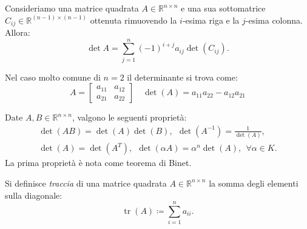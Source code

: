 \begin{theorem}
	Consideriamo una matrice quadrata $A\in \mathbb{R}^{n\times n}$ e una sua sottomatrice $C_{ij} \in \mathbb{R}^{( n-1) \times ( n-1)}$ ottenuta rimuovendo la $i$-esima riga e la $j$-esima colonna.
  Allora:
	\begin{equation*}
		\operatorname{det} A=\sum ^{n}_{j=1}( -1)^{i+j} a_{ij}\operatorname{det}( C_{ij}) .
	\end{equation*}
\end{theorem}
Nel caso molto comune di $n=2$ il determinante si trova come:
\begin{equation*}
A=\begin{bmatrix}
a_{11} & a_{12}\\
a_{21} & a_{22}
\end{bmatrix} \quad \operatorname{det}( A) =a_{11} a_{22} -a_{12} a_{21}
\end{equation*}
\begin{theorem}
	Date $A,B\in \mathbb{R}^{n\times n}$, valgono le seguenti proprietà:
	\begin{gather*}
		\operatorname{det}( AB) =\operatorname{det}( A)\operatorname{det}( B) ,\ \ \operatorname{det}\left( A^{-1}\right) =\frac{1}{\operatorname{det}( A)} ,\\
		\operatorname{det}( A) =\operatorname{det}\left( A^{T}\right) ,\ \ \operatorname{det}( \alpha A) =\alpha ^{n}\operatorname{det}( A) ,\ \ \forall \alpha \in K.
	\end{gather*}
  La prima proprietà è nota come teorema di Binet.
\end{theorem}
\begin{definition}
	[Traccia]
	Si definisce \textit{traccia} di una matrice quadrata $A\in \mathbb{R}^{n\times n}$ la somma degli elementi sulla diagonale:
	\begin{equation*}
		\operatorname{tr}( A) \coloneqq \sum ^{n}_{i=1} a_{ii} .
	\end{equation*}
\end{definition}

